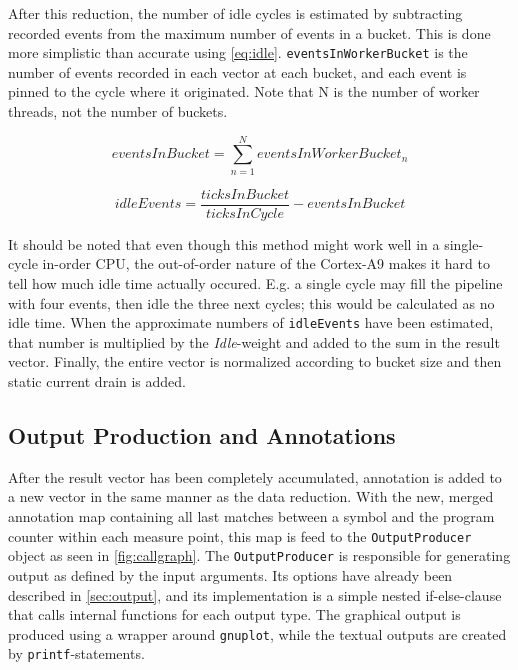 After this reduction, the number of idle cycles is estimated by subtracting
recorded events from the maximum number of events in a bucket. This is done more
simplistic than accurate using \autoref{eq:idle}. \texttt{eventsInWorkerBucket} is the
number of events recorded in each vector at each bucket, and each event is
pinned to the cycle where it originated. Note that N is the number of worker
threads, not the number of buckets.

\begin{equation}
    eventsInBucket = \sum_{n=1}^{N} eventsInWorkerBucket_n
\end{equation}

\begin{equation}
    idleEvents = \frac{ticksInBucket}{ticksInCycle} - eventsInBucket
\label{eq:idle}
\end{equation}

It should be noted that even though this method might work well in a
single-cycle in-order CPU, the out-of-order nature of the Cortex-A9 makes it
hard to tell how much idle time actually occured. E.g. a single cycle may fill
the pipeline with four events, then idle the three next cycles; this would be
calculated as no idle time. When the approximate numbers of \texttt{idleEvents} have been
estimated, that number is multiplied by the \emph{Idle}-weight and added to the
sum in the result vector. Finally, the entire vector is normalized according to
bucket size and then static current drain is added.


\subsection{Output Production and Annotations}

After the result vector has been completely accumulated, annotation is added to
a new vector in the same manner as the data reduction. With the new, merged
annotation map containing all last matches between a symbol and the program
counter within each measure point, this map is feed to the
\texttt{OutputProducer} object as seen in \autoref{fig:callgraph}. The
\texttt{OutputProducer} is responsible for generating output as defined by the
input arguments. Its options have already been described in
\autoref{sec:output}, and its implementation is a simple nested if-else-clause
that calls internal functions for each output type. The graphical output is
produced using a wrapper around \texttt{gnuplot}, while the textual outputs are
created by \texttt{printf}-statements.


